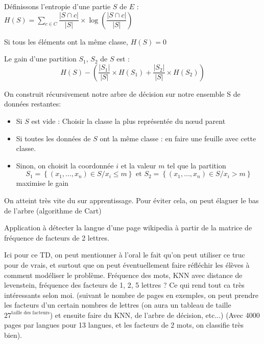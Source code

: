 \begin{definition}
	Définissons l'entropie d'une partie $S$ de $E$ : $H(S) = \sum\limits_{c \in C} \dfrac{|S\cap c|}{|S|} \times \log\left(\dfrac{|S\cap c|}{|S|}\right)$
\end{definition}

\begin{rem}
	Si tous les éléments ont la même classe, $H(S) = 0$
\end{rem}

\begin{definition}
	Le gain d'une partition $S_1$, $S_2$ de $S$ est : $$H(S) - \left( \dfrac{|S_1|}{|S|} \times H(S_1) + \dfrac{|S_2|}{|S|} \times H(S_2) \right)$$	
\end{definition}

\begin{algo}
	On construit récursivement notre arbre de décision sur notre ensemble S de données restantes:
	\begin{itemize}[label=$\bullet$]
		\item Si $S$ est vide : Choisir la classe la plus représentée du nœud parent
		\item Si toutes les données de $S$ ont la même classe : en faire une feuille avec cette classe.
		\item Sinon, on choisit la coordonnée $i$ et la valeur $m$ tel que la partition $$ S_1 = \left\{ (x_1, \dots, x_n) \in S / x_i \leq m\right\} \text{ et } S_2 = \left\{ (x_1, \dots, x_n) \in S / x_i > m\right\}$$ maximise le gain
	\end{itemize}
\end{algo}

\begin{rem}
	On atteint très vite du sur apprentissage. Pour éviter cela, on peut élaguer le bas de l'arbre (algorithme de Cart)
\end{rem}

\begin{exercise}
	Application à détecter la langue d'une page wikipedia à partir de la matrice de fréquence de facteurs de 2 lettres.
\end{exercise}

\begin{com}
	Ici pour ce TD, on peut mentionner à l'oral le fait qu'on peut utiliser ce truc pour de vrais, et surtout que on peut éventuellement faire réfléchir les élèves à comment modéliser le problème. Fréquence des mots, KNN avec distance de levenstein, fréquence des facteurs de 1, 2, 5 lettres ? Ce qui rend tout ca très intéressants selon moi. (suivant le nombre de pages en exemples, on peut prendre les facteurs d'un certain nombres de lettres (on aura un tableau de taille $27^{\text{taille des facteurs}}$) et ensuite faire du KNN, de l'arbre de décision, etc...) (Avec 4000 pages par langues pour 13 langues, et les facteurs de 2 mots, on classifie très bien).
\end{com}

